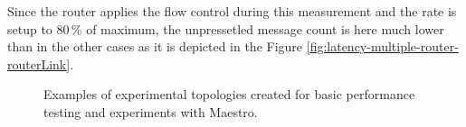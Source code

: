 Since the router applies the flow control during this measurement and the rate is setup to 80\,\% of maximum, the unpressetled message count is here much lower than in the other cases as it is depicted in the Figure \ref{fig:latency-multiple-router-routerLink}.

\begin{figure}[h]
	\centering
	\begin{minipage}{0.49\linewidth}
	\end{minipage}
	\begin{minipage}{0.49\linewidth}
	\end{minipage}
	\caption[Examples of experimental topologies created for basic performance testing and experiments with Maestro.]{Examples of experimental topologies created for basic performance testing and experiments with Maestro.}\label{fig:routerLink-latency}
\end{figure}

